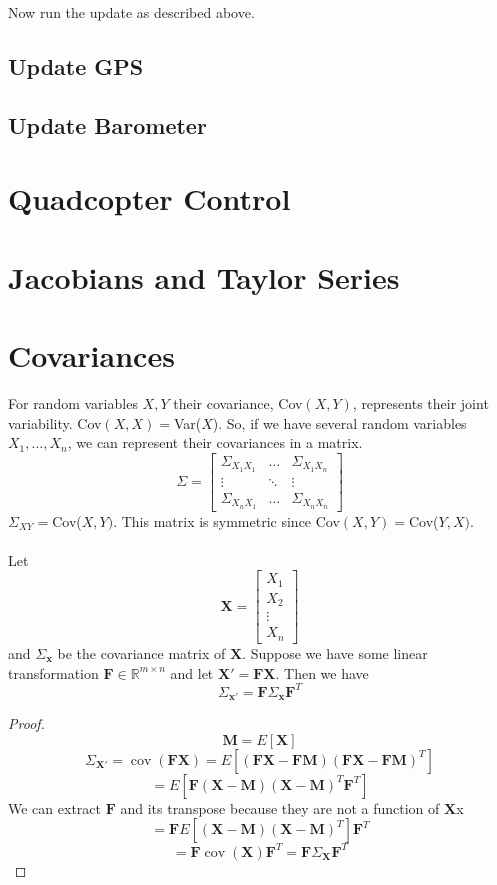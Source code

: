 \documentclass[11pt]{article}
\newcommand{\R}{\mathbb{R}}
\renewcommand{\vec}[1]{\mathbf{#1}}
\newcommand{\mat}[1]{\mathbf{#1}}
\begin{document}
	Now run the update as described above.
	

\subsection{Update GPS}
\subsection{Update Barometer}

\section{Quadcopter Control}

\appendix
\section{Jacobians and Taylor Series}


\section{Covariances}
For random variables $X,Y$ their covariance, Cov$(X,Y)$, represents their joint variability. Cov$(X,X) = $Var($X$). So, if we have several random variables $X_1, \dots, X_n$, we can represent their covariances in a matrix.
$$\Sigma = \begin{bmatrix}
\Sigma_{X_1X_1}& \dots &\Sigma_{X_1X_n}\\
\vdots &\ddots &\vdots\\
\Sigma_{X_nX_1} & \dots & \Sigma_{X_nX_n}
\end{bmatrix}$$
$\Sigma_{XY} = $Cov($X,Y)$.
This matrix is symmetric since Cov$(X,Y) = $Cov($Y,X)$.\\\\
Let 
$$\vec{X} = \begin{bmatrix}
X_1\\ X_2 \\ \vdots \\ X_n
\end{bmatrix}$$ and $\Sigma_{\vec{x}}$ be the covariance matrix of $\vec{X}$. Suppose we have some linear transformation $\mat{F} \in \R^{m \times n}$ and let $\vec{X}' = \mat{F}\vec{X}$. Then we have $$\Sigma_{\vec{x}'} = \mat{F}\Sigma_{\vec{x}}\mat{F}^T$$
\begin{proof}
$$\vec{M} = E[\vec{X}]$$
$$\Sigma_{\vec{X}'}=\operatorname{cov}(\mat{F}\vec{X}) = E[(\mat{F}\vec{X} - \mat{F}\vec{M})(\mat{F}\vec{X} - \mat{F}\vec{M})^T]$$
$$= E[\mat{F}(\vec{X} - \vec{M})(\vec{X} - \vec{M})^T\mat{F}^T]$$
We can extract $\mat{F}$ and its transpose because they are not a function of $\vec{X}$x
$$=\mat{F}E[(\vec{X} - \vec{M})(\vec{X} - \vec{M})^T]\mat{F}^T$$
$$=\mat{F}\operatorname{cov}(\vec{X})\mat{F}^T = \mat{F}\Sigma_{\vec{X}}\mat{F}^T$$
\end{proof}
\end{document}
